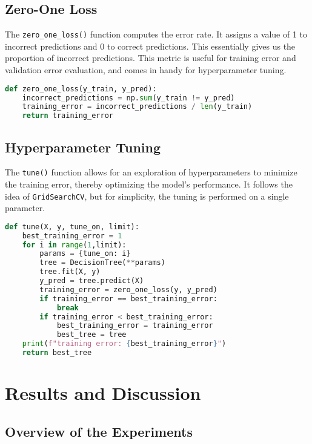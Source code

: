 \documentclass{article}
\begin{document}
\subsection{Zero-One Loss}
The \texttt{zero\_one\_loss()} function computes the error rate. It assigns a value of 1 to incorrect predictions and 0 to correct predictions. This essentially gives us the proportion of incorrect predictions.  This metric is useful for training error and validation error evaluation, and comes in handy for hyperparameter tuning.

\begin{lstlisting}[language=Python, caption=Zero-One Loss Calculation]
def zero_one_loss(y_train, y_pred):
    incorrect_predictions = np.sum(y_train != y_pred)
    training_error = incorrect_predictions / len(y_train)
    return training_error
\end{lstlisting}

\subsection{Hyperparameter Tuning}
The \texttt{tune()} function allows for an exploration of hyperparameters to minimize the training error, thereby optimizing the model's performance. It follows the idea of \texttt{GridSearchCV}, but for simplicity, the tuning is performed on a single parameter.

\begin{lstlisting}[language=Python, caption=Hyperparameter Tuning Function]
def tune(X, y, tune_on, limit):
    best_training_error = 1
    for i in range(1,limit):
        params = {tune_on: i}
        tree = DecisionTree(**params)
        tree.fit(X, y)
        y_pred = tree.predict(X)
        training_error = zero_one_loss(y, y_pred)
        if training_error == best_training_error:
            break
        if training_error < best_training_error:
            best_training_error = training_error
            best_tree = tree
    print(f"training error: {best_training_error}")
    return best_tree
\end{lstlisting}

\section{Results and Discussion}

\subsection{Overview of the Experiments}
\end{document}
